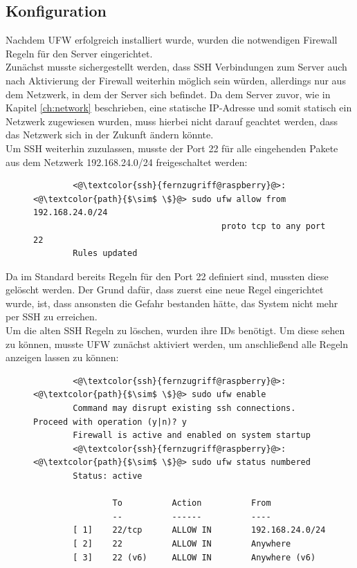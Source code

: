 \documentclass[a4paper, 12pt]{scrartcl}
\begin{document}
\subsection{Konfiguration}\label{ch:firewall_config}
Nachdem UFW erfolgreich installiert wurde, wurden die notwendigen Firewall Regeln für den Server eingerichtet.
\\
Zunächst musste sichergestellt werden, dass SSH Verbindungen zum Server auch nach Aktivierung der Firewall weiterhin möglich sein würden, allerdings nur aus dem Netzwerk, in dem der
Server sich befindet. Da dem Server zuvor, wie in Kapitel \ref{ch:network} beschrieben, eine statische IP-Adresse und somit statisch ein Netzwerk zugewiesen wurden, muss hierbei
nicht darauf geachtet werden, dass das Netzwerk sich in der Zukunft ändern könnte.
\\
Um SSH weiterhin zuzulassen, musste der Port 22 für alle eingehenden Pakete aus dem Netzwerk 192.168.24.0/24 freigeschaltet
werden:
\begin{figure}[H]
    \begin{mdframed}[backgroundcolor=bbg]
        \begin{lstlisting}
        <@\textcolor{ssh}{fernzugriff@raspberry}@>:<@\textcolor{path}{$\sim$ \$}@> sudo ufw allow from 192.168.24.0/24 
                                      proto tcp to any port 22
        Rules updated
        \end{lstlisting}
    \end{mdframed}
    \label{lst:allow_ssh_from_network}
\end{figure}
Da im Standard bereits Regeln für den Port 22 definiert sind, mussten diese gelöscht werden. Der Grund dafür, dass zuerst eine neue Regel eingerichtet wurde, ist,
dass ansonsten die Gefahr bestanden hätte, das System nicht mehr per SSH zu erreichen.
\\
Um die alten SSH Regeln zu löschen, wurden ihre IDs benötigt. Um diese sehen zu können, musste UFW zunächst aktiviert werden, um anschließend alle Regeln anzeigen lassen
zu können:
\begin{figure}[H]
    \begin{mdframed}[backgroundcolor=bbg]
        \begin{lstlisting}
        <@\textcolor{ssh}{fernzugriff@raspberry}@>:<@\textcolor{path}{$\sim$ \$}@> sudo ufw enable
        Command may disrupt existing ssh connections. Proceed with operation (y|n)? y
        Firewall is active and enabled on system startup
        <@\textcolor{ssh}{fernzugriff@raspberry}@>:<@\textcolor{path}{$\sim$ \$}@> sudo ufw status numbered
        Status: active

                To          Action          From
                --          ------          ----
        [ 1]    22/tcp      ALLOW IN        192.168.24.0/24
        [ 2]    22          ALLOW IN        Anywhere
        [ 3]    22 (v6)     ALLOW IN        Anywhere (v6)
        \end{lstlisting}
    \end{mdframed}
    \label{lst:ufw_enable_status}
\end{figure}
\end{document}
